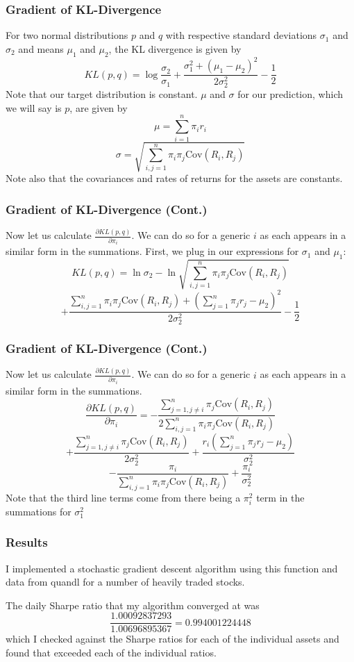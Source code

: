 \documentclass{beamer}
\begin{document}
\begin{frame}
\frametitle{Gradient of KL-Divergence}
For two normal distributions $p$ and $q$ with respective standard deviations $\sigma_1$ and $\sigma_2$ and means $\mu_1$ and $\mu_2$, the KL divergence is given by 
\[KL(p,q) = \log\frac{\sigma_2}{\sigma_1} + \frac{\sigma_1^2 + (\mu_1 - \mu_2)^2}{2\sigma_2^2} - \frac{1}{2}\]
Note that our target distribution is constant.  $\mu$ and $\sigma$ for our prediction, which we will say is $p$, are given by
\[\mu = \sum_{i=1}^n \pi_i r_i\]
\[\sigma = \sqrt{\sum_{i,j=1}^n \pi_i \pi_j \text{Cov} (R_i, R_j)}\]
Note also that the covariances and rates of returns for the assets are constants.
\end{frame}

\begin{frame}
\frametitle{Gradient of KL-Divergence (Cont.)}
Now let us calculate $\frac{\partial KL(p,q)}{\partial \pi_i}$.  We can do so for a generic $i$ as each appears in a similar form in the summations.  First, we plug in our expressions for $\sigma_1$ and $\mu_1$:
\[KL(p,q) = \ln \sigma_2 - \ln \sqrt{\sum_{i,j=1}^n \pi_i \pi_j \text{Cov} (R_i, R_j)} \]\[ + \frac{\sum_{i,j=1}^n \pi_i \pi_j \text{Cov} (R_i, R_j) + (\sum_{j=1}^n \pi_j r_j - \mu_2)^2}{2\sigma_2^2} - \frac{1}{2}\]
\end{frame}

\begin{frame}
\frametitle{Gradient of KL-Divergence (Cont.)}
Now let us calculate $\frac{\partial KL(p,q)}{\partial \pi_i}$.  We can do so for a generic $i$ as each appears in a similar form in the summations.
\[\frac{\partial KL(p,q)}{\partial \pi_i} =  - \frac{\sum_{j=1, j\neq i}^n \pi_j \text{Cov} (R_i, R_j)}{2\sum_{i,j=1}^n \pi_i \pi_j \text{Cov} (R_i, R_j)} \]
\[ + \frac{\sum_{j=1, j \neq i}^n \pi_j \text{Cov} (R_i, R_j)}{2\sigma_2^2} + \frac{r_i (\sum_{j=1}^n \pi_j r_j - \mu_2)}{\sigma_2^2} \]
\[- \frac{ \pi_i}{\sum_{i,j=1}^n \pi_i \pi_j \text{Cov} (R_i, R_j)} + \frac{\pi_i}{\sigma_2^2} 
\]
Note that the third line terms come from there being a $\pi_i^2$ term in the summations for $\sigma_1^2$
\end{frame}


\begin{frame}
\frametitle{Results}
I implemented a stochastic gradient descent algorithm using this function and data from quandl for a number of heavily traded stocks.

The daily Sharpe ratio that my algorithm converged at was 
\[\frac{1.00092837293}{1.00696895367} = 0.994001224448\]
which I checked against the Sharpe ratios for each of the individual assets and found that exceeded each of the individual ratios.
\end{frame}
\end{document}
